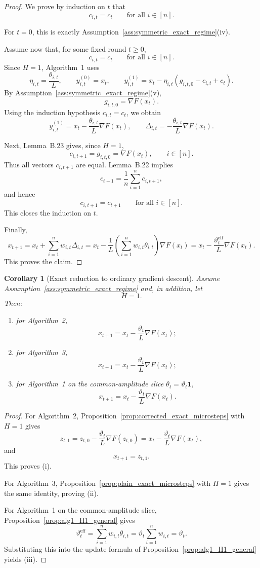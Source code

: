 \documentclass{article}
\newtheorem{corollary}[theorem]{Corollary}
\theoremstyle{definition}
\newcommand{\one}{\mathbf 1}
\begin{document}
\begin{proof}
We prove by induction on $t$ that
\[
c_{i,t}=c_t
\qquad \text{for all } i \in [n].
\]

For $t=0$, this is exactly Assumption~\ref{ass:symmetric_exact_regime}(iv).

Assume now that, for some fixed round $t \ge 0$,
\[
c_{i,t}=c_t
\qquad \text{for all } i \in [n].
\]
Since $H=1$, Algorithm~1 uses
\[
\eta_{i,t} = \frac{\theta_{i,t}}{L},
\qquad
y_{i,t}^{(0)} = x_t,
\qquad
y_{i,t}^{(1)}
=
x_t - \eta_{i,t}(g_{i,t,0} - c_{i,t} + c_t).
\]
By Assumption~\ref{ass:symmetric_exact_regime}(v),
\[
g_{i,t,0} = \nabla F(x_t).
\]
Using the induction hypothesis $c_{i,t}=c_t$, we obtain
\[
y_{i,t}^{(1)}
=
x_t - \frac{\theta_{i,t}}{L}\nabla F(x_t),
\qquad
\Delta_{i,t}
=
-\frac{\theta_{i,t}}{L}\nabla F(x_t).
\]

Next, Lemma~B.23 gives, since $H=1$,
\[
c_{i,t+1} = g_{i,t,0} = \nabla F(x_t),
\qquad i \in [n].
\]
Thus all vectors $c_{i,t+1}$ are equal. Lemma~B.22 implies
\[
c_{t+1} = \frac1n \sum_{i=1}^n c_{i,t+1},
\]
and hence
\[
c_{i,t+1}=c_{t+1}
\qquad \text{for all } i \in [n].
\]
This closes the induction on $t$.

Finally,
\[
x_{t+1}
=
x_t + \sum_{i=1}^n w_{i,t}\Delta_{i,t}
=
x_t - \frac{1}{L}\left(\sum_{i=1}^n w_{i,t}\theta_{i,t}\right)\nabla F(x_t)
=
x_t - \frac{\vartheta_t^{\mathrm{eff}}}{L}\nabla F(x_t).
\]
This proves the claim.
\end{proof}

\begin{corollary}[Exact reduction to ordinary gradient descent]
\label{cor:exact_reduction_gd}
Assume Assumption~\ref{ass:symmetric_exact_regime} and, in addition, let
\[
H=1.
\]
Then:
\begin{enumerate}[label=(\roman*)]
    \item for Algorithm~2,
    \[
    x_{t+1} = x_t - \frac{\vartheta_t}{L}\nabla F(x_t);
    \]
    \item for Algorithm~3,
    \[
    x_{t+1} = x_t - \frac{\vartheta_t}{L}\nabla F(x_t);
    \]
    \item for Algorithm~1 on the common-amplitude slice $\theta_t=\vartheta_t\one$,
    \[
    x_{t+1} = x_t - \frac{\vartheta_t}{L}\nabla F(x_t).
    \]
\end{enumerate}
\end{corollary}

\begin{proof}
For Algorithm~2, Proposition~\ref{prop:corrected_exact_microsteps} with $H=1$ gives
\[
z_{t,1}
=
z_{t,0} - \frac{\vartheta_t}{L}\nabla F(z_{t,0})
=
x_t - \frac{\vartheta_t}{L}\nabla F(x_t),
\]
and
\[
x_{t+1}=z_{t,1}.
\]
This proves (i).

For Algorithm~3, Proposition~\ref{prop:plain_exact_microsteps} with $H=1$ gives the same identity, proving (ii).

For Algorithm~1 on the common-amplitude slice, Proposition~\ref{prop:alg1_H1_general} gives
\[
\vartheta_t^{\mathrm{eff}}
=
\sum_{i=1}^n w_{i,t}\theta_{i,t}
=
\vartheta_t \sum_{i=1}^n w_{i,t}
=
\vartheta_t.
\]
Substituting this into the update formula of Proposition~\ref{prop:alg1_H1_general} yields (iii).
\end{proof}
\end{document}
